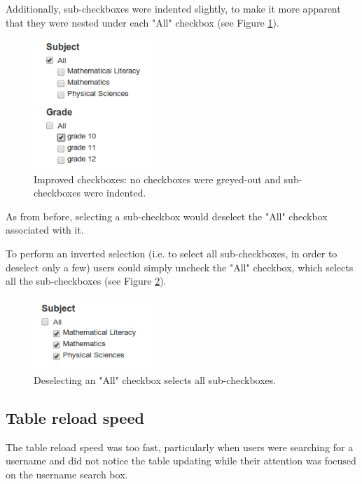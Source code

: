 Additionally, sub-checkboxes were indented slightly, to make it more apparent that they were nested under each "All" checkbox (see Figure \ref{fig:newcheckbox}).

\begin{figure}[h!]
    \centering
    \includegraphics[width=0.4\textwidth]{Figures/V2/checkboxes.png}
 \caption{Improved checkboxes: no checkboxes were greyed-out and sub-checkboxes were indented.}
 \label{fig:newcheckbox}
\end{figure}


As from before, selecting a sub-checkbox would deselect the "All" checkbox associated with it. 

To perform an inverted selection (i.e. to select all sub-checkboxes, in order to deselect only a few) users could simply uncheck the "All" checkbox, which selects all the sub-checkboxes (see Figure \ref{fig:deselectedcheck}).

\begin{figure}[h!]
    \centering
    \includegraphics[width=0.4\textwidth]{Figures/V2/deselectAll.png}
 \caption{Deselecting an "All" checkbox selects all sub-checkboxes.}
 \label{fig:deselectedcheck}
\end{figure}


\subsection{Table reload speed}
The table reload speed was too fast, particularly when users were searching for a username and did not notice the table updating while their attention was focused on the username search box. 

